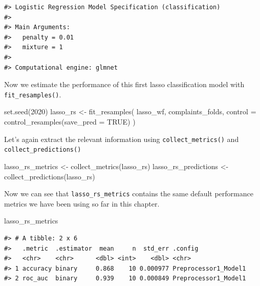 \documentclass[
]{krantz}
\makeatletter
\newenvironment{Shaded}{\begin{snugshade}}{\end{snugshade}}
\newcommand{\AttributeTok}[1]{\textcolor[rgb]{0.77,0.63,0.00}{#1}}
\newcommand{\ConstantTok}[1]{\textcolor[rgb]{0.00,0.00,0.00}{#1}}
\newcommand{\DecValTok}[1]{\textcolor[rgb]{0.00,0.00,0.81}{#1}}
\newcommand{\FunctionTok}[1]{\textcolor[rgb]{0.00,0.00,0.00}{#1}}
\newcommand{\NormalTok}[1]{#1}
\newcommand{\OtherTok}[1]{\textcolor[rgb]{0.56,0.35,0.01}{#1}}
\newenvironment{kframe}{%
\medskip{}
\setlength{\fboxsep}{.8em}
 \def\at@end@of@kframe{}%
 \ifinner\ifhmode%
  \def\at@end@of@kframe{\end{minipage}}%
  \begin{minipage}{\columnwidth}%
 \fi\fi%
 \def\FrameCommand##1{\hskip\@totalleftmargin \hskip-\fboxsep
 \colorbox{shadecolor}{##1}\hskip-\fboxsep
     \hskip-\linewidth \hskip-\@totalleftmargin \hskip\columnwidth}%
 \MakeFramed {\advance\hsize-\width
   \@totalleftmargin\z@ \linewidth\hsize
   \@setminipage}}%
 {\par\unskip\endMakeFramed%
 \at@end@of@kframe}
\renewenvironment{Shaded}{\begin{kframe}}{\end{kframe}}
\makeatother
\begin{document}
\begin{verbatim}
#> Logistic Regression Model Specification (classification)
#> 
#> Main Arguments:
#>   penalty = 0.01
#>   mixture = 1
#> 
#> Computational engine: glmnet
\end{verbatim}

Now we estimate the performance of this first lasso classification model with \texttt{fit\_resamples()}.

\begin{Shaded}
\begin{Highlighting}[]
\FunctionTok{set.seed}\NormalTok{(}\DecValTok{2020}\NormalTok{)}
\NormalTok{lasso\_rs }\OtherTok{\textless{}{-}} \FunctionTok{fit\_resamples}\NormalTok{(}
\NormalTok{  lasso\_wf,}
\NormalTok{  complaints\_folds,}
  \AttributeTok{control =} \FunctionTok{control\_resamples}\NormalTok{(}\AttributeTok{save\_pred =} \ConstantTok{TRUE}\NormalTok{)}
\NormalTok{)}
\end{Highlighting}
\end{Shaded}

Let's again extract the relevant information using \texttt{collect\_metrics()} and \texttt{collect\_predictions()}

\begin{Shaded}
\begin{Highlighting}[]
\NormalTok{lasso\_rs\_metrics }\OtherTok{\textless{}{-}} \FunctionTok{collect\_metrics}\NormalTok{(lasso\_rs)}
\NormalTok{lasso\_rs\_predictions }\OtherTok{\textless{}{-}} \FunctionTok{collect\_predictions}\NormalTok{(lasso\_rs)}
\end{Highlighting}
\end{Shaded}

Now we can see that \texttt{lasso\_rs\_metrics} contains the same default performance metrics we have been using so far in this chapter.

\begin{Shaded}
\begin{Highlighting}[]
\NormalTok{lasso\_rs\_metrics}
\end{Highlighting}
\end{Shaded}

\begin{verbatim}
#> # A tibble: 2 x 6
#>   .metric  .estimator  mean     n  std_err .config             
#>   <chr>    <chr>      <dbl> <int>    <dbl> <chr>               
#> 1 accuracy binary     0.868    10 0.000977 Preprocessor1_Model1
#> 2 roc_auc  binary     0.939    10 0.000849 Preprocessor1_Model1
\end{verbatim}
\end{document}

